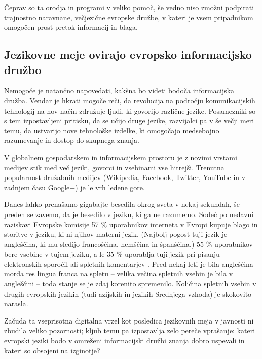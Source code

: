 \begin{multicols}{2}
Čeprav so ta orodja in programi v veliko pomoč, še vedno niso zmožni podpirati trajnostno naravnane, večjezične evropske družbe, v kateri je vsem pripadnikom omogočen prost pretok informacij in blaga.

\subsection{Jezikovne meje ovirajo evropsko informacijsko družbo}
  
Nemogoče je natančno napovedati, kakšna bo videti bodoča informacijska družba. Vendar je hkrati mogoče reči, da revolucija na področju komunikacij\-skih tehnologij na nov način združuje ljudi, ki govorijo različne jezike. Posamezniki so s tem izpostavljeni pritisku, da se učijo druge jezike, razvijalci pa v še večji meri temu, da ustvarijo nove tehnološke izdelke, ki omogočajo medsebojno razumevanje in dostop do skupnega znanja. 


V globalnem gospodarskem in informacijskem prostoru je z novimi vrstami medijev stik med več jeziki, govorci in vsebinami vse hitrejši. Trenutna popularnost družabnih medijev (Wikipedia, Facebook, Twitter, YouTube in v zadnjem času Google+) je le vrh ledene gore.

Danes lahko prenašamo gigabajte besedila okrog sveta v nekaj sekundah, še preden se zavemo, da je besedilo v jeziku, ki ga ne razumemo. Sodeč po nedavni raziskavi Evropske komisije 57 \% uporabnikov interneta v Evropi kupuje blago in storitve v jeziku, ki ni njihov materni jezik. (Najbolj pogost tuji jezik je angleščina, ki mu sledijo francoščina, nemščina in španščina.) 55 \% uporabnikov bere vsebine v tujem jeziku, a le 35 \% uporablja tuji jezik pri pisanju elektronskih sporočil ali spletnih komentarjev \cite{EC1}.  Pred nekaj leti je bila angleščina morda res lingua franca na spletu – velika večina spletnih vsebin je bila v angleščini – toda stanje se je zdaj kore\-nito spremenilo. Količina spletnih vsebin v drugih evropskih jezikih (tudi azijskih in jezikih Srednjega vzhoda) je skokovito narasla.

Začuda ta vseprisotna digitalna vrzel kot posledica jezikovnih meja v javnosti ni zbudila veliko pozornosti; kljub temu pa izpostavlja zelo pereče vprašanje: kateri evropski jeziki bodo v omreženi informacijski družbi znanja dobro uspevali in kateri so obsojeni na izginotje?


\end{multicols}
